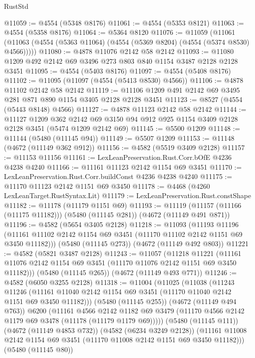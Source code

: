 \begin{lexlean}{RustStd}
\begin{coremodule}
{\begin{coremodule}
{{{{{{{{{{{{{{{{@11059 := @4554 (@5348 @8176)
@11061 := @4554 (@5353 @8121)
@11063 := @4554 (@5358 @8176)
@11064 := @5364 @8120
@11076 := @11059
    (@11061 (@11063 (@4554 (@5363 @11064) (@4554 (@5369 @8204) (@4554 (@5374 @8530) @4566)))))
@11080 := @4878 @11076 @2142 @58 @2142
@11093 := @11080 @1209 @492 @2142 @69 @3496 @273 @803 @840 @1154 @3487 @2128 @2128 @3451
@11095 := @4554 (@5403 @8176)
@11097 := @4554 (@5408 @8176)
@11102 := @11095 (@11097 (@4554 (@5413 @8530) @4566))
@11106 := @4878 @11102 @2142 @58 @2142
@11119 := @11106 @1209 @491 @2142 @69 @3495 @281 @871 @890 @1154 @3405 @2128 @2128 @3451
@11123 := @8527 (@4554 (@5443 @8148) @4566)
@11127 := @4878 @11123 @2142 @58 @2142
@11144 := @11127
    @1209
    @362
    @2142
    @69
    @3150
    @94
    @912
    @925
    @1154
    @3409
    @2128
    @2128
    @3451
    (@5474 @1209 @2142 @69)
@11145 := @5500 @1209
@11148 := @11144 (@5480 (@11145 @94))
@11149 := @5507 @1209
@11153 := @11148 (@4672 (@11149 @362 @912))
@11156 := @4582 (@5519 @3409 @2128)
@11157 := @11153 @11156
@11161 := LexLeanPreservation.Rust.Corr.bOfE @4236 @4238 @4240
@11166 := @11161 @11123 @2142 @1154 @69 @3451
@11170 := LexLeanPreservation.Rust.Corr.buildConst @4236 @4238 @4240
@11175 := @11170 @11123 @2142 @1151 @69 @3450
@11178 := @4468 (@4260 LexLeanTarget.RustSyntax.Lit)
@11179 := LexLeanPreservation.Rust.constShape
@11182 := @11178 (@11179 @1151 @69)
@11193 := @11119 (@11157 (@11166 (@11175 @11182))) (@5480 (@11145 @281)) (@4672 (@11149 @491 @871))
@11196 := @4582 (@5654 @3405 @2128)
@11218 := @11093
    (@11193
      @11196
      (@11161 @11102 @2142 @1154 @69 @3451 (@11170 @11102 @2142 @1151 @69 @3450 @11182)))
    (@5480 (@11145 @273))
    (@4672 (@11149 @492 @803))
@11221 := @4582 (@5821 @3487 @2128)
@11243 := @11057
    (@11218
      @11221
      (@11161 @11076 @2142 @1154 @69 @3451 (@11170 @11076 @2142 @1151 @69 @3450 @11182)))
    (@5480 (@11145 @265))
    (@4672 (@11149 @493 @771))
@11246 := @4582 (@6050 @3255 @2128)
@11318 := @11004
    (@11025
      (@11038
        (@11243
          @11246
          (@11161 @11040 @2142 @1154 @69 @3451 (@11170 @11040 @2142 @1151 @69 @3450 @11182)))
        (@5480 (@11145 @255))
        (@4672 (@11149 @494 @763))
        @6200
        (@11161
          @4566
          @2142
          @1182
          @69
          @3479
          (@11170 @4566 @2142 @1179 @69 @3478 (@11178 (@11179 @1179 @69)))))
      (@5480 (@11145 @111))
      (@4672 (@11149 @4853 @732))
      (@4582 (@6234 @3249 @2128))
      (@11161 @11008 @2142 @1154 @69 @3451 (@11170 @11008 @2142 @1151 @69 @3450 @11182)))
    (@5480 (@11145 @80))
}}}}}}}}}}}}}}}}
\end{coremodule}}
\end{coremodule}
\end{lexlean}
